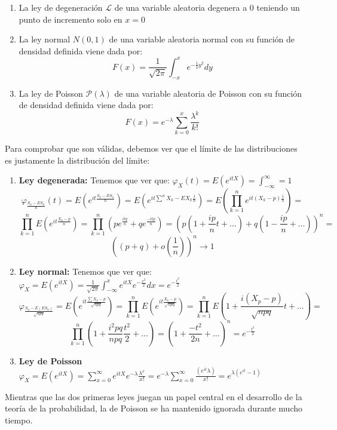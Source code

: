 \documentclass[12pt,a4paper]{book}
\begin{document}
\begin{enumerate}
\item La ley de degeneración $\mathcal{L}$ de una variable aleatoria degenera a 0 teniendo un punto de incremento solo en $x=0$
\item La ley normal $N(0,1)$ de una variable aleatoria normal con su función de densidad definida viene dada por:
$$F(x)=\frac{1}{\sqrt{2\pi}}\int_{-x}^{x}e^{-\frac{1}{2}y^2}dy$$
\item La ley de Poisson $\mathcal{P}(\lambda)$ de una variable aleatoria de Poisson con su función de densidad definida viene dada por:
$$F(x)=e^{-\lambda}\sum_{k=0}^x \frac{\lambda^k}{k!}$$
\end{enumerate}
Para comprobar que son válidas, debemos ver que el límite de las distribuciones es justamente la distribución del límite:
\begin{enumerate}
\item \textbf{Ley degenerada: }Tenemos que ver que: $\varphi_{X}(t)=E(e^{itX})=\int_{-\infty}^{\infty}=1$
$$\varphi_{\frac{S_n -ES_n}{n}}(t)=E(e^{it\frac{S_n-ES_n}{n}})=E(e^{it\sum^n X_k-EX_k\frac{1}{n}})=E(\prod_{k=1}^{n}e^{it(X_k-p)\frac{1}{n}})=$$
$$\prod_{k=1}^{n}E(e^{it\frac{X_k-p}{n}})=\prod_{k=1}^{n}(pe^{\frac{itq}{n}}+qe^{\frac{-itp}{n}})=(p(1+\frac{ip}{n}t+\ldots)+q(1-\frac{ip}{n}+\ldots))^n=$$
$$((p+q)+o(\frac{1}{n}))^n\rightarrow 1$$
\item \textbf{Ley normal: }Tenemos que ver que: $\varphi_X=E(e^{itX})=\frac{1}{\sqrt{2 \pi}}\int_{-\infty}^{x}e^{itX}e^{-\frac{x^2}{2}}dx=e^{-\frac{t^2}{2}}$
$$\varphi_{\frac{S_n-E(ES_n)}{\sqrt{npq}}}=E(e^{it\frac{\sum X_k-p}{\sqrt{npq}}})=\prod_{k=1}^{n} E(e^{it\frac{X_k-p}{\sqrt{npq}}})=\prod_{k=1}^{n}E(1+\frac{i(X_p-p)}{\sqrt{npq}}t+\ldots)=$$
$$\prod_{k=1}^{n}(1+\frac{i^2pq}{npq}\frac{t^2}{2}+\ldots)=(1+\frac{-t^2}{2n}+\ldots)^n=e^{-\frac{t^2}{2}}$$
\item \textbf{Ley de Poisson} $\varphi_X=E(e^{itX})=\displaystyle\sum_{x=0}^{\infty}e^{itX}e^{-\lambda}\frac{\lambda^x}{x!}=e^{-\lambda}\displaystyle\sum_{x=0}^{\infty}\frac{(e^{it}\lambda)}{x!}=e^{\lambda(e^{it}-1)}$
\end{enumerate}
Mientras que las dos primeras leyes juegan un papel central en el desarrollo de la teoría de la probabilidad, la de Poisson se ha mantenido ignorada durante mucho tiempo.
\end{document}
